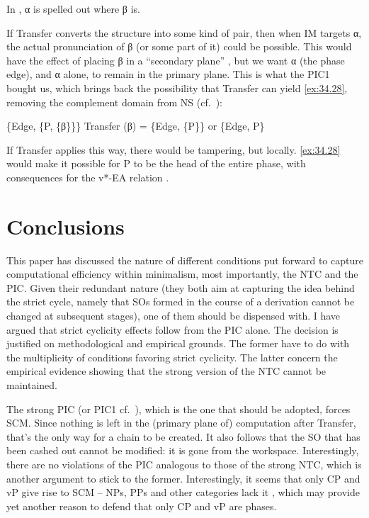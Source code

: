 \documentclass[output=paper]{langsci/langscibook}
\begin{document}
\ea%
    \label{ex:34.27}
    In , α is spelled out where β is. \parencite[199]{Chomsky2004}
\z

If Transfer converts the structure into some kind of pair, then when \gls{IM}
targets α, the actual pronunciation of β (or some part of it) could be
possible.  This would have the effect of placing β in a “secondary plane”
\citep{Chomsky2004}, but we want α (the phase edge), and α alone, to remain in
the primary plane.  This is what the PIC1 bought us, which brings back the
possibility that Transfer can yield \eqref{ex:34.28}, removing the complement domain from
\gls{NS} (cf.~\cite{Ott2011}):

\ea%
    \label{ex:34.28}
	\ea \{Edge, \{P, \{β\}\}\}
	\ex Transfer (β) = \{Edge, \{P\}\} or \{Edge, P\}
	\z
\z

If Transfer applies this way, there would be tampering, but locally. \eqref{ex:34.28} would
make it possible for P to be the head of the entire phase, with consequences
for the v*-\gls{EA} relation \parencite[cf.][]{EpShim2015}.

\section{Conclusions}\label{sec:34.5}

This paper has discussed the nature of different conditions put forward to
capture computational efficiency within minimalism, most importantly, the
\gls{NTC} and the \gls{PIC}. Given their redundant nature (they both aim at
capturing the idea behind the strict cycle, namely that \glspl{SO} formed in
the course of a derivation cannot be changed at subsequent stages), one of them
should be dispensed with.  I have argued that strict cyclicity effects follow
from the \gls{PIC} alone. The decision is justified on methodological and
empirical grounds. The former have to do with the multiplicity of conditions
favoring strict cyclicity. The latter concern the empirical evidence showing
that the strong version of the \gls{NTC} cannot be maintained.

The strong \gls{PIC} (or PIC1 cf.~\citealt{Chomsky2000}), which is the one that
should be adopted, forces \gls{SCM}. Since nothing is left in the (primary
plane of) computation after Transfer, that’s the only way for a chain to be
created. It also follows that the \gls{SO} that has been cashed out cannot be
modified: it is gone from the workspace. Interestingly, there are no violations
of the \gls{PIC} analogous to those of the strong \gls{NTC}, which is another
argument to stick to the former. Interestingly, it seems that only CP and vP
give rise to SCM -- NPs, PPs and other categories lack it
\parencite[cf.][]{Gallego2012,vanUrk2016}, which may provide yet another reason
to defend that only CP and vP are phases.
\end{document}
